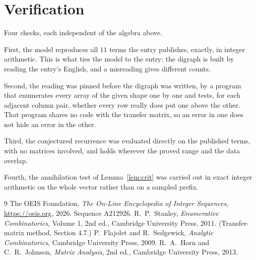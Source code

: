 \documentclass[11pt,a4paper]{article}
\theoremstyle{plain}
\theoremstyle{definition}
\begin{document}
\section{Verification}

Four checks, each independent of the algebra above.

First, the model reproduces all $11$ terms the entry publishes, exactly, in integer
arithmetic. This is what ties the model to the entry: the digraph is built by reading the
entry's English, and a misreading gives different counts.

Second, the reading was pinned before the digraph was written, by a program that enumerates
every array of the given shape one by one and tests, for each adjacent column pair,
whether every row really does put one above the other. That program shares no code with the transfer matrix, so an error in one does not
hide an error in the other.

Third, the conjectured recurrence was evaluated directly on the published terms, with no
matrices involved, and holds wherever the proved range and the data overlap.

Fourth, the annihilation test of Lemma~\ref{lem:crit} was carried out in exact integer
arithmetic on the whole vector rather than on a sampled prefix.

\begin{thebibliography}{9}
 The OEIS Foundation, \emph{The On-Line Encyclopedia of Integer
Sequences}, \url{https://oeis.org}, 2026. Sequence A212926.
 R.~P.~Stanley, \emph{Enumerative Combinatorics}, Volume 1, 2nd ed.,
Cambridge University Press, 2011. (Transfer-matrix method, Section 4.7.)
 P.~Flajolet and R.~Sedgewick, \emph{Analytic Combinatorics}, Cambridge
University Press, 2009.
 R.~A.~Horn and C.~R.~Johnson, \emph{Matrix Analysis}, 2nd ed., Cambridge
University Press, 2013.
\end{thebibliography}
\end{document}
